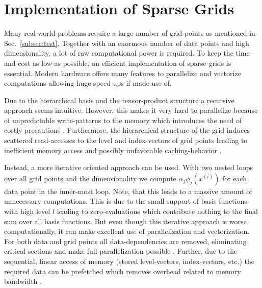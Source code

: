 \section{Implementation of Sparse Grids}
Many real-world problems require a large number of grid points as mentioned in
Sec.~\ref{subsec:test}. Together with an enormous number of data points and
high dimensionality, a lot of raw computational power is required. To keep
the time and cost as low as possible, an efficient implementation of
sparse grids is essential. Modern hardware offers many features to parallelize
and vectorize computations allowing huge speed-ups if made use of.
\par
Due to the hierarchical basis and the tensor-product structure
a recursive approach seems intuitive. However, this makes it
very hard to parallelize because of unpredictable write-patterns to the
memory which introduces the need of costly precautions \cite{disshei}.
Furthermore, the hierarchical structure of the grid induces scattered
read-accesses to the level and index-vectors of grid points leading to
inefficient memory access and possibly unfavorable caching-behavior \cite{disshei}.
\par
Instead, a more iterative oriented approach can be used. With two nested loops
over all grid points and the dimensionality we compute $\alpha_j \phi_j(x^{(i)})$
for each data point in the inner-most loop. Note, that this leads to a massive amount of
unnecessary computations. This is due to the small support of basis functions
with high level $l$ leading to zero-evaluations which contribute nothing to
the final sum over all basis functions. But even though this iterative
approach is worse computationally, it can make excellent use of parallelization
and vectorization. For both data and grid points all data-dependencies are
removed, eliminating critical sections and make full parallelization possible
\cite{disshei}. Further, due to the sequential, linear access of memory
(stored level-vectors, index-vectors, etc.) the required data can be
 prefetched which removes overhead related to memory bandwidth \cite{disshei}.

